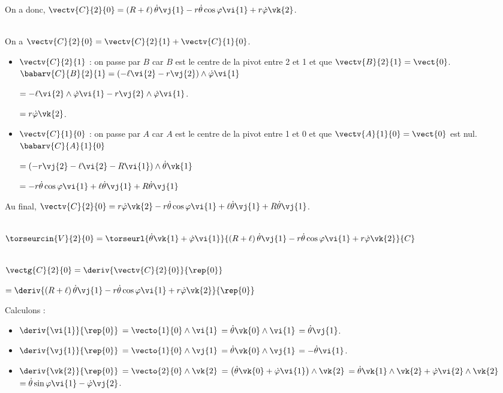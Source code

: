 On a donc, 
$\vectv{C}{2}{0}= \left(R+\ell\right)\dot{\theta}\vj{1} -r\dot{\theta}\cos\varphi \vi{1} + r\dot{\varphi}\vk{2}$.
\else
\fi


\ifprof ~\\
On a $\vectv{C}{2}{0}= \vectv{C}{2}{1}+\vectv{C}{1}{0}$.
\begin{itemize}
\item $\vectv{C}{2}{1}$ : on passe par $B$ car $B$ est le centre de la pivot entre 2 et 1 et que $\vectv{B}{2}{1}=\vect{0}$. 
$\babarv{C}{B}{2}{1} =\left(-\ell\vi{2}-r\vj{2} \right)\wedge \dot{\varphi}\vi{1} $ 

$=-\ell\vi{2}\wedge \dot{\varphi}\vi{1}-r\vj{2} \wedge \dot{\varphi}\vi{1}$.

$=r\dot{\varphi}\vk{2}$.

\item $\vectv{C}{1}{0}$ : on passe par $A$ car $A$ est le centre de la pivot entre 1 et 0 et que $\vectv{A}{1}{0}=\vect{0}$ est nul. 
$\babarv{C}{A}{1}{0}$ 

$=\left(-r\vj{2}-\ell\vi{2}-R\vi{1}\right)\wedge \dot{\theta}\vk{1}$

$=-r\dot{\theta}\cos\varphi\vi{1}+\ell\dot{\theta}\vj{1}+R\dot{\theta}\vj{1}$ %
\end{itemize}

Au final, 
 $\vectv{C}{2}{0}=r\dot{\varphi}\vk{2}-r\dot{\theta}\cos\varphi\vi{1}+\ell\dot{\theta}\vj{1}+R\dot{\theta}\vj{1}$.
\else
\fi


\ifprof ~\\
$\torseurcin{V}{2}{0} = \torseurl{\dot{\theta}\vk{1}+ \dot{\varphi}\vi{1}}{\left(R+\ell\right)\dot{\theta}\vj{1} -r\dot{\theta}\cos\varphi \vi{1} + r\dot{\varphi}\vk{2}}{C}$
\else
\fi

\ifprof ~\\
 
 $\vectg{C}{2}{0} = \deriv{\vectv{C}{2}{0}}{\rep{0}}$
 
 $ = \deriv{\left(R+\ell\right)\dot{\theta}\vj{1} -r\dot{\theta}\cos\varphi \vi{1} + r\dot{\varphi}\vk{2}}{\rep{0}}$
 
 Calculons : 
\begin{itemize}
\item $\deriv{\vi{1}}{\rep{0}}$ $=\vecto{1}{0} \wedge \vi{1}$ $=\dot{\theta}\vk{0} \wedge \vi{1}$ $=\dot{\theta}\vj{1}$.
\item $\deriv{\vj{1}}{\rep{0}}$ $=\vecto{1}{0} \wedge \vj{1}$ $=\dot{\theta}\vk{0} \wedge \vj{1}$ $=-\dot{\theta}\vi{1}$.
\item $\deriv{\vk{2}}{\rep{0}}$ $=\vecto{2}{0} \wedge \vk{2}$ 
$=\left(\dot{\theta}\vk{0}+ \dot{\varphi}\vi{1} \right) \wedge \vk{2}$
$=\dot{\theta}\vk{1} \wedge \vk{2}+ \dot{\varphi}\vi{2}  \wedge \vk{2}$
$=\dot{\theta}\sin\varphi\vi{1}- \dot{\varphi}\vj{2}$.
\end{itemize}

